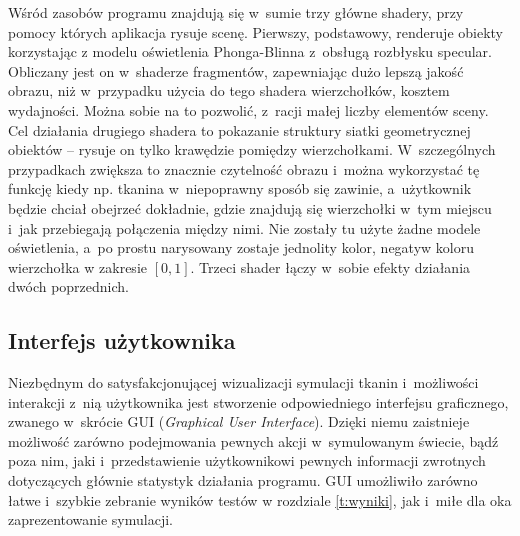 		Wśród zasobów programu znajdują się w~sumie trzy główne shadery, przy pomocy których aplikacja rysuje scenę. Pierwszy, podstawowy, renderuje obiekty korzystając z modelu oświetlenia Phonga-Blinna z~obsługą rozbłysku specular. Obliczany jest on w~shaderze fragmentów, zapewniając dużo lepszą jakość obrazu, niż w~przypadku użycia do tego shadera wierzchołków, kosztem wydajności. Można sobie na to pozwolić, z~racji małej liczby elementów sceny. Cel działania drugiego shadera to pokazanie struktury siatki geometrycznej obiektów -- rysuje on tylko krawędzie pomiędzy wierzchołkami. W~szczególnych przypadkach zwiększa to znacznie czytelność obrazu i~można wykorzystać tę funkcję kiedy np. tkanina w~niepoprawny sposób się zawinie, a~użytkownik będzie chciał obejrzeć dokładnie, gdzie znajdują się wierzchołki w~tym miejscu i~jak przebiegają połączenia między nimi. Nie zostały tu użyte żadne modele oświetlenia, a~po prostu narysowany zostaje jednolity kolor, negatyw koloru wierzchołka w zakresie \([0, 1]\). Trzeci shader łączy w~sobie efekty działania dwóch poprzednich.
		
		\subsection{Interfejs użytkownika}
		\label{t:praktyka:silnik:gui}
		
		
		Niezbędnym do satysfakcjonującej wizualizacji symulacji tkanin i~możliwości interakcji z~nią użytkownika jest stworzenie odpowiedniego interfejsu graficznego, zwanego w~skrócie GUI (\emph{Graphical User Interface}). Dzięki niemu zaistnieje możliwość zarówno podejmowania pewnych akcji w~symulowanym świecie, bądź poza nim, jaki i~przedstawienie użytkownikowi pewnych informacji zwrotnych dotyczących głównie statystyk działania programu. GUI umożliwiło zarówno łatwe i~szybkie zebranie wyników testów w rozdziale \ref{t:wyniki}, jak i~miłe dla oka zaprezentowanie symulacji.
		
